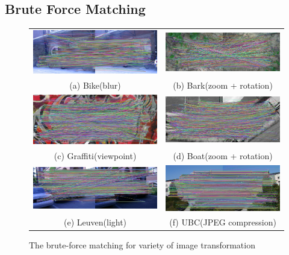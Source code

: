 \subsection {Brute Force Matching}
\begin{figure}[H]
\begin{tabular}{cc}
  \includegraphics[width=75mm]{figures/bike_brute_1_3} &  \includegraphics[width=75mm]{figures/barks_brute_1_3} \\
(a) Bike(blur) & (b) Bark(zoom + rotation) \\[6pt]
 \includegraphics[width=75mm]{figures/graffiti_brute_1_3} &  \includegraphics[width=75mm]{figures/boat_brute_1_3} \\
(c) Graffiti(viewpoint) & (d) Boat(zoom + rotation) \\[6pt]
 \includegraphics[width=75mm]{figures/leuven_brute_1_3} &  \includegraphics[width=75mm]{figures/ubc_brute_1_3} \\
(e) Leuven(light) & (f) UBC(JPEG compression) \\[6pt]
\end{tabular}
\caption{The brute-force matching for variety of image transformation}\label{fig:brute_force_matching}
\end{figure}

